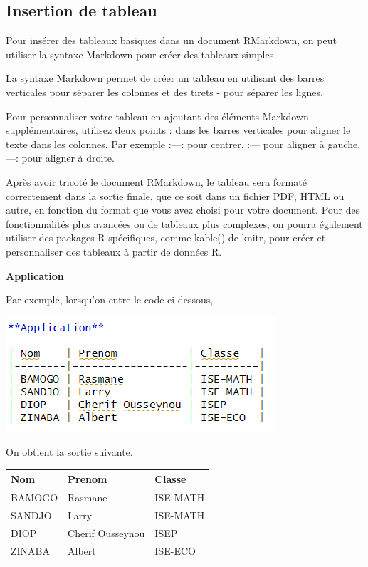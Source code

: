 \documentclass[
  12pt,
]{article}
\begin{document}
\subsection{Insertion de tableau}\label{insertion-de-tableau}

Pour insérer des tableaux basiques dans un document RMarkdown, on peut
utiliser la syntaxe Markdown pour créer des tableaux simples.

La syntaxe Markdown permet de créer un tableau en utilisant des barres
verticales \texttt{\textbar{}} pour séparer les colonnes et des tirets -
pour séparer les lignes.

Pour personnaliser votre tableau en ajoutant des éléments Markdown
supplémentaires, utilisez deux points : dans les barres verticales pour
aligner le texte dans les colonnes. Par exemple :---: pour centrer, :---
pour aligner à gauche, ---: pour aligner à droite.

Après avoir tricoté le document RMarkdown, le tableau sera formaté
correctement dans la sortie finale, que ce soit dans un fichier PDF,
HTML ou autre, en fonction du format que vous avez choisi pour votre
document. Pour des fonctionnalités plus avancées ou de tableaux plus
complexes, on pourra également utiliser des packages R spécifiques,
comme kable() de knitr, pour créer et personnaliser des tableaux à
partir de données R.

\textbf{Application}

Par exemple, lorsqu'on entre le code ci-dessous,

\begin{center}\includegraphics[width=0.7\linewidth,height=0.7\textheight]{../Document_Rmarkdown/Images/code_tableau} \end{center}

On obtient la sortie suivante.

\begin{longtable}[]{@{}lll@{}}
\toprule\noalign{}
Nom & Prenom & Classe \\
\midrule\noalign{}
\endhead
\bottomrule\noalign{}
\endlastfoot
BAMOGO & Rasmane & ISE-MATH \\
SANDJO & Larry & ISE-MATH \\
DIOP & Cherif Ousseynou & ISEP \\
ZINABA & Albert & ISE-ECO \\
\end{longtable}
\end{document}
